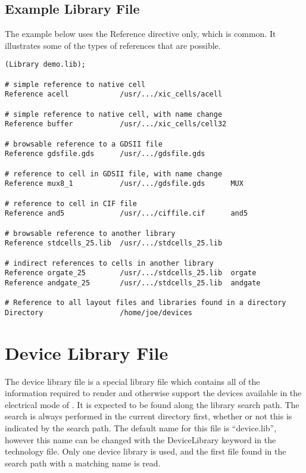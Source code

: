 \subsection{Example Library File}
The example below uses the {\vt Reference} directive only, which is
common.  It illustrates some of the types of references that are
possible.

\begin{verbatim}
(Library demo.lib);

# simple reference to native cell
Reference acell            /usr/.../xic_cells/acell

# simple reference to native cell, with name change
Reference buffer           /usr/.../xic_cells/cell32

# browsable reference to a GDSII file
Reference gdsfile.gds      /usr/.../gdsfile.gds

# reference to cell in GDSII file, with name change
Reference mux8_1           /usr/.../gdsfile.gds      MUX

# reference to cell in CIF file
Reference and5             /usr/.../ciffile.cif      and5

# browsable reference to another library
Reference stdcells_25.lib  /usr/.../stdcells_25.lib

# indirect references to cells in another library
Reference orgate_25        /usr/.../stdcells_25.lib  orgate
Reference andgate_25       /usr/.../stdcells_25.lib  andgate

# Reference to all layout files and libraries found in a directory
Directory                  /home/joe/devices
\end{verbatim}


\section{Device Library File}
\label{devdotlib}
The device library file is a special library file which contains all
of the information required to render and otherwise support the
devices available in the electrical mode of {\Xic}.  It is expected to
be found along the library search path.  The search is always
performed in the current directory first, whether or not this is
indicated by the search path.  The default name for this file is
``{\vt device.lib}'', however this name can be changed with the {\vt
DeviceLibrary} keyword in the technology file.  Only one device
library is used, and the first file found in the search path with a
matching name is read.

